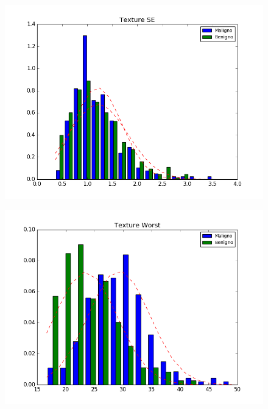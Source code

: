 \documentclass[11pt,a4paper]{article}
\numberwithin{equation}{section}
\begin{document}
\begin{itemize}
\begin{figure}[H]
\centering
\begin{minipage}{.5\textwidth}
  \centering
  \includegraphics[width=\linewidth]{../img/hist//texture_se}
  \label{fig:test1}
\end{minipage}%
\begin{minipage}{.5\textwidth}
  \centering
  \includegraphics[width=\linewidth]{../img/hist/texture_worst}
  \label{fig:test2}
\end{minipage}
\end{figure}


\end{itemize}
\end{document}
